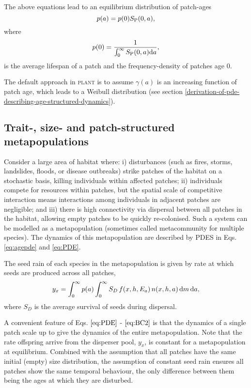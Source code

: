 \documentclass[10pt,twoside]{article}
\newcommand{\plant}{\textsc{plant}}
\begin{document}
The above equations lead to an equilibrium distribution of patch-ages
\begin{equation} p(a) = p(0) S_{\rm P} (0,a),
\end{equation}
where
\begin{equation}
  p(0) = \frac1{\int_0^\infty S_{\rm P} (0,a) {\rm d}a},
\end{equation}
is the average lifespan of a patch and the frequency-density of patches
age \(0\).

The default approach in {\plant} is to assume  $\gamma(a)$ is an
increasing function of patch age, which leads to a Weibull distribution
(see section \ref{derivation-of-pde-describing-age-structured-dynamics}).

\subsection{Trait-, size- and patch-structured
metapopulations}\label{trait--size--and-patch-structured-metapopulations}

Consider a large area of habitat where: i) disturbances (such as fires,
storms, landslides, floods, or disease outbreaks) strike patches of the
habitat on a stochastic basis, killing individuals within affected
patches; ii) individuals compete for resources within patches, but the
spatial scale of competitive interaction means interactions among
individuals in adjacent patches are negligible; and iii) there is high
connectivity via dispersal between all patches in the habitat, allowing
empty patches to be quickly re-colonised. Such a system can be modelled
as a metapopulation (sometimes called metacommunity for multiple
species). The dynamics of this metapopulation are described by PDES in
Eqs. \ref{eq:agepde} and \ref{eq:PDE}.

The seed rain of each species in the metapopulation is given by rate at
which seeds are produced across all patches,
\begin{equation}  \label{eq:seed_rain} 
  y_x = \int_0^{\infty} p(a)  \int_0^{\infty}  S_D \, f(x,h,E_a) \, n(x,h,a)\,{\rm d} m \, {\rm d} a,
\end{equation}
where \(S_D\) is the average survival of seeds during dispersal.

A convenient feature of Eqs. \(\ref{eq:PDE}\) - \(\ref{eq:BC2}\) is that
the dynamics of a single patch scale up to give the dynamics of the
entire metapopulation. Note that the rate offspring arrive from the
disperser pool, \(y_x\), is constant for a metapopulation at
equilibrium. Combined with the assumption that all patches have the same
initial (empty) size distribution, the assumption of constant seed rain
ensures all patches show the same temporal behaviour, the only
difference between them being the ages at which they are disturbed.
\end{document}
